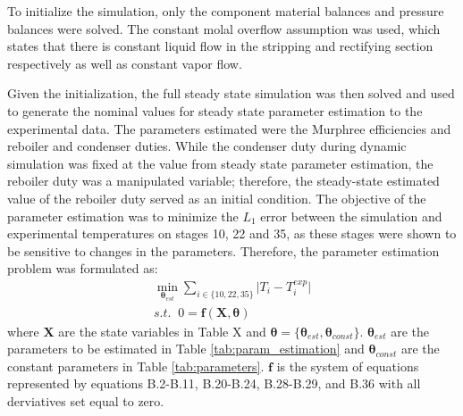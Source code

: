 To initialize  the simulation, only the component material balances and pressure balances were solved. The constant molal overflow assumption was used, which states that there is constant liquid flow in the stripping and rectifying section respectively as well as constant vapor flow. 

Given the initialization, the full steady state simulation was then solved and used to generate the nominal values for steady state parameter estimation to the experimental data. The parameters estimated were the Murphree efficiencies and reboiler and condenser duties. While the condenser duty during dynamic simulation was fixed at the value from steady state parameter estimation, the reboiler duty was a manipulated variable; therefore, the steady-state estimated value of the reboiler duty served as an initial condition. The objective of the parameter estimation was to minimize the $L_1$ error between the simulation and experimental temperatures on stages 10, 22 and 35, as these stages were shown to be sensitive to changes in the parameters. Therefore, the parameter estimation problem was formulated as:
\begin{subequations}
    \begin{align}
        \min_{\boldsymbol \theta_{est}} \sum_{i\in \{10, 22, 35\}} \mathopen|T_i-T_i^{exp}\mathclose|\\
        s.t. \;\; 0 = \mathbf f(\mathbf X, \boldsymbol \theta)
    \end{align}
\end{subequations}
where $\mathbf X$ are the state variables in Table X  and $\boldsymbol \theta = \{\boldsymbol \theta_{est}, \boldsymbol \theta_{const} \}$.  $\boldsymbol \theta_{est}$ are the parameters to be estimated in Table \ref{tab:param_estimation} and $\boldsymbol \theta_{const}$ are the constant parameters in Table \ref{tab:parameters}. $\mathbf f$ is the system of equations represented by equations B.2-B.11, B.20-B.24, B.28-B.29, and B.36 with all derviatives set equal to zero. 

